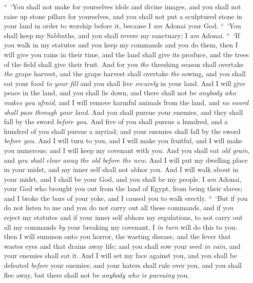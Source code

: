 \begin{biblechapter} %
 “ ‘You shall not make for yourselves idols and divine images, and you shall not raise up stone pillars for yourselves, and you shall not put a sculptured stone in your land in order to worship before it, because I \textit{am} Adonai your God.
\verse “ ‘You shall keep my Sabbaths, and you shall revere my sanctuary; I \textit{am} Adonai.
\verse “ ‘If you walk in my statutes and you keep my commands and you do them,
\verse then I will give you rains in their time, and the land shall give its produce, and the trees of the field shall give their fruit.
\verse And for you \textit{the} threshing season shall overtake \textit{the} grape harvest, and the grape harvest shall overtake \textit{the} sowing, and you shall eat your food \textit{to your fill} and you shall live \textit{securely} in your land.
\verse And I will give peace in the land, and you shall lie down, and there shall not be \textit{anybody who makes you afraid}, and I will remove harmful animals from the land, and \textit{no sword shall pass through your land}.
\verse And you shall pursue your enemies, and they shall fall by the sword \textit{before you}.
\verse And five of you shall pursue a hundred, and a hundred of you shall pursue a myriad; and your enemies shall fall by the sword \textit{before you}.
\verse And I will turn to you, and I will make you fruitful, and I will make you numerous; and I will keep my covenant with you.
\verse And you shall eat \textit{old grain}, and \textit{you shall clear away the old before the new}.
\verse And I will put my dwelling place in your midst, and my inner self shall not abhor you.
\verse And I will walk about in your midst, and I shall be your God, and you shall be my people.
\verse I \textit{am} Adonai, your God who brought you out from the land of Egypt, from being their slaves; and I broke the bars of your yoke, and I caused you to walk erectly.
 “ ‘But if you do not listen to me and you do not carry out all these commands,
\verse and if you reject my statutes and if your inner self abhors my regulations, to not carry out all my commands \textit{by} your breaking my covenant,
\verse I \textit{in turn} will do this to you: then I will summon onto you horror, the wasting disease, and the fever that wastes eyes and that drains away life; and you shall sow your seed \textit{in vain}, and your enemies shall eat it.
\verse And I will set my face against you, and you shall be defeated \textit{before} your enemies; and your haters shall rule over you, and you shall flee away, but there shall not be \textit{anybody who is pursuing} you.

\end{biblechapter}
